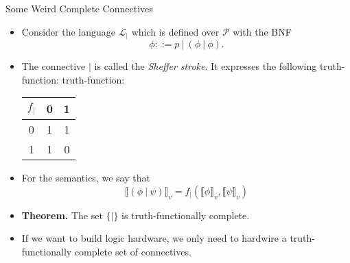 \documentclass[../slides.tex]{subfiles}
\begin{document}
\begin{frame}{Some Weird Complete Connectives}

  \begin{itemize}

    \item Consider the language $\mathcal{L}_|$ which is defined over
      $\mathcal{P}$ with the BNF \[\phi::=p~|~(\phi~|~\phi).\]

      \item The connective $|$ is called the \emph{Sheffer stroke}. It expresses the
        following truth-function:
        truth-function:

        \begin{center}
          \begin{tabular}[h!]{c | c c}
            $f_|$ & 0 & 1\\\hline
            0     & 1 & 1\\
            1     & 1 & 0
          \end{tabular}
        \end{center}
       \item For the semantics, we say that \[\llbracket
         (\phi~|~\psi)\rrbracket_v=f_|(\llbracket \phi\rrbracket_v,
         \llbracket\psi\rrbracket_v)\]

       \item \textbf{Theorem.} The set $\{|\}$ is truth-functionally
         complete.

         \item If we want to build logic hardware, we only need to
           hardwire a truth-functionally complete set of connectives.
    
  \end{itemize}
  
\end{frame}
\end{document}
